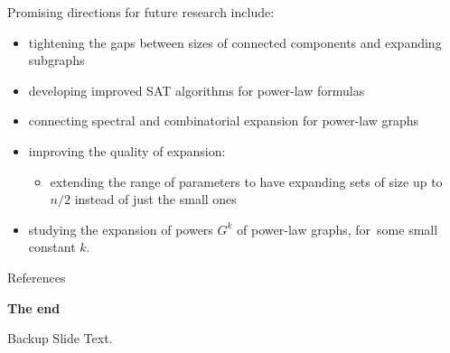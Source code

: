 \documentclass{beamer}
\newcommand{\autotitle}{\secname\ifdefempty{\subsecname}{}{~--- \subsecname}}
\begin{document}
\begin{frame}{\autotitle}
    \small
    Promising directions for future research include:
    \begin{itemize}
        \item tightening the gaps between sizes of connected components and expanding subgraphs
        \item developing improved SAT algorithms for power-law formulas
        \item connecting spectral and combinatorial expansion for power-law graphs
        \item improving the quality of expansion:
        \begin{itemize}
            \item extending the range of parameters to have expanding sets
            of size up to $n/2$ instead of just the small ones
        \end{itemize}
        \item studying the expansion of powers $G^k$ of power-law graphs,
        for~some small constant $k$.
    \end{itemize}
\end{frame}

\appendix

\begin{frame}[allowframebreaks]{References}
    
    
\end{frame}

\begin{frame}[standout]
    \centering
    \textbf{The end}
\end{frame}

\begin{frame}{Backup Slide}
    Text.
\end{frame}
\end{document}
